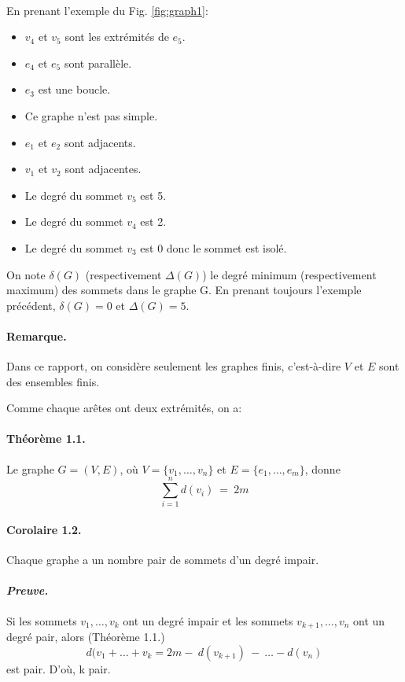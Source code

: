\paragraph*{}
En prenant l'exemple du Fig. \ref{fig:graph1}:
\begin{itemize}
	\item[\textbullet] $v_{4}$ et $v_{5}$ sont les extrémités de $e_{5}$.
	\item[\textbullet] $e_{4}$ et $e_{5}$ sont parallèle.
	\item[\textbullet] $e_{3}$ est une boucle.
	\item[\textbullet] Ce graphe n'est pas simple.
	\item[\textbullet] $e_{1}$ et $e_{2}$ sont adjacents.
	\item[\textbullet] $v_{1}$ et $v_{2}$ sont adjacentes.
	\item[\textbullet] Le degré du sommet $v_{5}$ est 5.
	\item[\textbullet] Le degré du sommet $v_{4}$ est 2.
	\item[\textbullet] Le degré du sommet $v_{3}$ est 0 donc le sommet est isolé.
\end{itemize}

On note $\delta (G)$ (respectivement $\varDelta (G)$) le degré minimum (respectivement maximum)
des sommets dans le graphe G.
En prenant toujours l'exemple précédent,  $\delta (G) = 0$ et $\varDelta (G) = 5$.
\paragraph*{Remarque.} Dans ce rapport, on considère seulement les graphes finis, c'est-à-dire
$V$ et $E$ sont des ensembles finis.

Comme chaque arêtes ont deux extrémités, on a:

\paragraph*{Théorème 1.1.} Le graphe $G=(V,E)$, où $V = \{v_{1},\dots,v_{n}\}$ et
$E=\{e_{1},\dots,e_{m} \}$, donne
	$$ \sum_{i=1}^{n}d(v_{i})\ =\ 2m  $$
\paragraph*{Corolaire 1.2.} Chaque graphe a un nombre pair de sommets d'un degré impair.

\paragraph*{\textit{Preuve.}} Si les sommets $v_{1},\dots,v_{k}$ ont un degré impair et 
les sommets $v_{k+1},\dots,v_{n}$ ont un degré pair, alors (Théorème 1.1.)
$$ d(v_{1}+\dots +v_{k}=2m -\ d(v_{k+1})\ -\ \dots-d(v_{n})$$ 
est pair. D'où, k pair.

